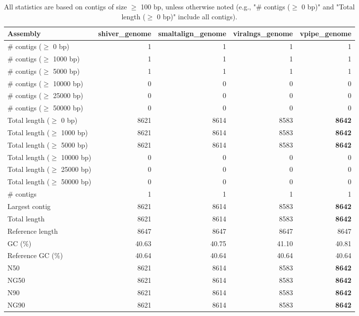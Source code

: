 \documentclass[12pt,a4paper]{article}
\begin{document}
\begin{table}[ht]
\begin{center}
\caption{All statistics are based on contigs of size $\geq$ 100 bp, unless otherwise noted (e.g., "\# contigs ($\geq$ 0 bp)" and "Total length ($\geq$ 0 bp)" include all contigs).}
\begin{tabular}{|l*{4}{|r}|}
\hline
Assembly & shiver\_genome & smaltalign\_genome & viralngs\_genome & vpipe\_genome \\ \hline
\# contigs ($\geq$ 0 bp) & 1 & 1 & 1 & 1 \\ \hline
\# contigs ($\geq$ 1000 bp) & 1 & 1 & 1 & 1 \\ \hline
\# contigs ($\geq$ 5000 bp) & 1 & 1 & 1 & 1 \\ \hline
\# contigs ($\geq$ 10000 bp) & 0 & 0 & 0 & 0 \\ \hline
\# contigs ($\geq$ 25000 bp) & 0 & 0 & 0 & 0 \\ \hline
\# contigs ($\geq$ 50000 bp) & 0 & 0 & 0 & 0 \\ \hline
Total length ($\geq$ 0 bp) & 8621 & 8614 & 8583 & {\bf 8642} \\ \hline
Total length ($\geq$ 1000 bp) & 8621 & 8614 & 8583 & {\bf 8642} \\ \hline
Total length ($\geq$ 5000 bp) & 8621 & 8614 & 8583 & {\bf 8642} \\ \hline
Total length ($\geq$ 10000 bp) & 0 & 0 & 0 & 0 \\ \hline
Total length ($\geq$ 25000 bp) & 0 & 0 & 0 & 0 \\ \hline
Total length ($\geq$ 50000 bp) & 0 & 0 & 0 & 0 \\ \hline
\# contigs & 1 & 1 & 1 & 1 \\ \hline
Largest contig & 8621 & 8614 & 8583 & {\bf 8642} \\ \hline
Total length & 8621 & 8614 & 8583 & {\bf 8642} \\ \hline
Reference length & 8647 & 8647 & 8647 & 8647 \\ \hline
GC (\%) & 40.63 & 40.75 & 41.10 & 40.81 \\ \hline
Reference GC (\%) & 40.64 & 40.64 & 40.64 & 40.64 \\ \hline
N50 & 8621 & 8614 & 8583 & {\bf 8642} \\ \hline
NG50 & 8621 & 8614 & 8583 & {\bf 8642} \\ \hline
N90 & 8621 & 8614 & 8583 & {\bf 8642} \\ \hline
NG90 & 8621 & 8614 & 8583 & {\bf 8642} \\ \hline

\end{tabular}
\end{center}
\end{table}
\end{document}
